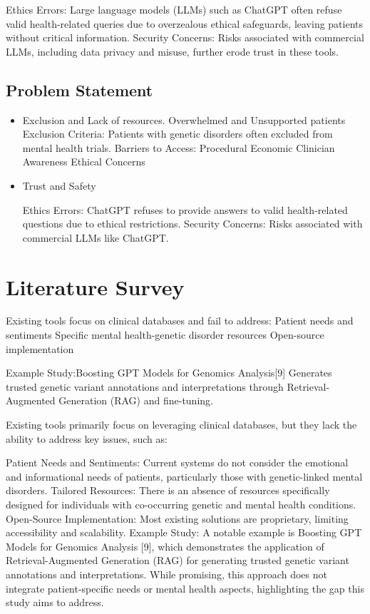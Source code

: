 \documentclass{article} %
\begin{document}
Ethics Errors: Large language models (LLMs) such as ChatGPT often refuse valid health-related queries due to overzealous ethical safeguards, leaving patients without critical information.
Security Concerns: Risks associated with commercial LLMs, including data privacy and misuse, further erode trust in these tools.

\subsection{Problem Statement}

\begin{itemize}
    \item Exclusion and Lack of resources.
        Overwhelmed and Unsupported patients 
        Exclusion Criteria: Patients with genetic disorders often excluded from mental health trials.
        Barriers to Access:
        Procedural
        Economic
        Clinician Awareness
        Ethical Concerns

    \item Trust and Safety

    Ethics Errors: ChatGPT refuses to provide answers to valid health-related questions due to ethical restrictions.
Security Concerns: Risks associated with commercial LLMs like ChatGPT.

    



\end{itemize}



\section{Literature Survey}

Existing tools focus on clinical databases and fail to address:
Patient needs and sentiments
Specific mental health-genetic disorder resources
Open-source implementation

Example Study:Boosting GPT Models for Genomics Analysis[9]
Generates trusted genetic variant annotations and interpretations through Retrieval-Augmented Generation (RAG) and fine-tuning.

Existing tools primarily focus on leveraging clinical databases, but they lack the ability to address key issues, such as:

Patient Needs and Sentiments: Current systems do not consider the emotional and informational needs of patients, particularly those with genetic-linked mental disorders.
Tailored Resources: There is an absence of resources specifically designed for individuals with co-occurring genetic and mental health conditions.
Open-Source Implementation: Most existing solutions are proprietary, limiting accessibility and scalability.
Example Study:
A notable example is Boosting GPT Models for Genomics Analysis [9], which demonstrates the application of Retrieval-Augmented Generation (RAG) for generating trusted genetic variant annotations and interpretations. While promising, this approach does not integrate patient-specific needs or mental health aspects, highlighting the gap this study aims to address.
\end{document}
